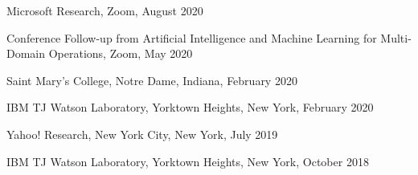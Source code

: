 \documentclass[10pt]{article}
\newenvironment{myindentpar}[1]%
{\begin{list}{}%
         {\setlength{\leftmargin}{#1}}%
         \item[]%
}
{\end{list}}
\newcounter{list}
\begin{document}
\begin{myindentpar}{0.75cm}
\hspace{-0.75cm} Microsoft Research, Zoom, August 2020
	
\hspace{-0.75cm} Conference Follow-up from Artificial Intelligence and Machine Learning for Multi-Domain Operations, Zoom, May 2020
	
\hspace{-0.75cm} Saint Mary's College, Notre Dame, Indiana, February 2020
	
\hspace{-0.75cm} IBM TJ Watson Laboratory, Yorktown Heights, New York, February 2020
	
\hspace{-0.75cm} Yahoo! Research, New York City, New York, July 2019

\hspace{-0.75cm} IBM TJ Watson Laboratory, Yorktown Heights, New York, October 2018
	












\end{myindentpar}
\end{document}
